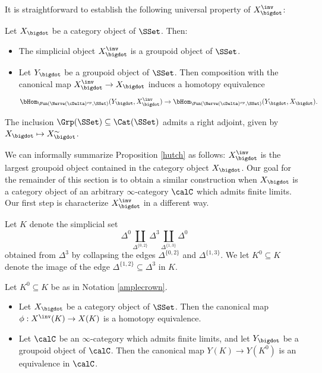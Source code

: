 It is straightforward to establish the following universal property of $X_{\bigdot}^{\inv}$:

\begin{proposition}\label{hutch}
Let $X_{\bigdot}$ be a category object of $\SSet$. Then:
\begin{itemize}
\item[$(1)$] The simplicial object $X_{\bigdot}^{\inv}$ is a groupoid object of $\SSet$.
\item[$(2)$] Let $Y_{\bigdot}$ be a groupoid object of $\SSet$. Then composition with
the canonical map $X_{\bigdot}^{\inv} \rightarrow X_{\bigdot}$ induces a homotopy
equivalence
$$ \bHom_{ \Fun( \Nerve(\cDelta)^{op}, \SSet)}( Y_{\bigdot}, X_{\bigdot}^{\inv})
\rightarrow \bHom_{ \Fun( \Nerve(\cDelta)^{op}, \SSet)}( Y_{\bigdot}, X_{\bigdot} ).$$
\end{itemize}
\end{proposition}

\begin{corollary}\label{slam}
The inclusion $\Grp(\SSet) \subseteq \Cat(\SSet)$ admits a right adjoint, given by
$X_{\bigdot} \mapsto X_{\bigdot}^{\sim}$.
\end{corollary}

We can informally summarize Proposition \ref{hutch} as follows: $X_{\bigdot}^{\inv}$ is the
largest groupoid object contained in the category object $X_{\bigdot}$. Our goal for the remainder of this section is to obtain a similar construction when $X_{\bigdot}$ is a category object
of an arbitrary $\infty$-category $\calC$ which admits finite limits. Our first step
is characterize $X_{\bigdot}^{\inv}$ in a different way.

\begin{notation}\label{amplecrown}
Let $K$ denote the simplicial set $$\Delta^0 \coprod_{ \Delta^{ \{0,2\} }} \Delta^3 \coprod_{ \Delta^{ \{1,3\} }} \Delta^0$$ obtained from $\Delta^3$ by collapsing the edges $\Delta^{ \{0,2\} }$ and $\Delta^{ \{1,3\} }$.
We let $K^{0} \subseteq K$ denote the image of the edge $\Delta^{ \{1,2\} } \subseteq \Delta^3$ in $K$.
\end{notation}

\begin{proposition}\label{canman}
Let $K^0 \subseteq K$ be as in Notation \ref{amplecrown}.
\begin{itemize}
\item[$(1)$] Let $X_{\bigdot}$ be a category object of $\SSet$. Then the canonical map
$\phi: X^{\inv}(K) \rightarrow X(K)$ is a homotopy equivalence.
\item[$(2)$] Let $\calC$ be an $\infty$-category which admits finite limits, and let
$Y_{\bigdot}$ be a groupoid object of $\calC$. Then the canonical map
$Y(K) \rightarrow Y(K^0)$ is an equivalence in $\calC$.
\end{itemize}
\end{proposition}

